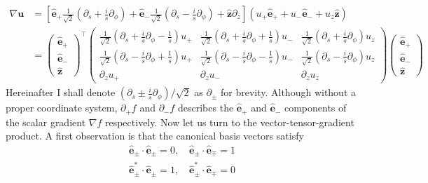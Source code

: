\begin{equation}\label{eqn:grad-u-canonical}
\begin{aligned}
    \nabla \mathbf{u} &= \left[\hat{\mathbf{e}}_+ \frac{1}{\sqrt{2}}\left(\partial_s + \frac{i}{s}\partial_\phi\right) + \hat{\mathbf{e}}_- \frac{1}{\sqrt{2}}\left(\partial_s - \frac{i}{s}\partial_\phi\right) + \hat{\mathbf{z}} \partial_z\right] \left(u_+ \hat{\mathbf{e}}_+ + u_- \hat{\mathbf{e}}_- + u_z \hat{\mathbf{z}}\right) \\ 
    &= \begin{pmatrix} \hat{\mathbf{e}}_+ \\ \hat{\mathbf{e}}_- \\ \hat{\mathbf{z}} \end{pmatrix}^\top 
    \begin{pmatrix}
        \frac{1}{\sqrt{2}} \left(\partial_s + \frac{i}{s}\partial_\phi - \frac{1}{s}\right) u_+ & \frac{1}{\sqrt{2}} \left(\partial_s + \frac{i}{s}\partial_\phi + \frac{1}{s}\right) u_- & \frac{1}{\sqrt{2}} \left(\partial_s + \frac{i}{s}\partial_\phi\right) u_z \\ 
        \frac{1}{\sqrt{2}} \left(\partial_s - \frac{i}{s}\partial_\phi + \frac{1}{s}\right) u_+ & \frac{1}{\sqrt{2}} \left(\partial_s - \frac{i}{s}\partial_\phi - \frac{1}{s}\right) u_- & \frac{1}{\sqrt{2}} \left(\partial_s - \frac{i}{s}\partial_\phi\right) u_z \\ 
        \partial_z u_+ & \partial_z u_- & \partial_z u_z
    \end{pmatrix}
    \begin{pmatrix} \hat{\mathbf{e}}_+ \\ \hat{\mathbf{e}}_- \\ \hat{\mathbf{z}} \end{pmatrix}
\end{aligned}
\end{equation}
%
Hereinafter I shall denote $(\partial_s \pm \frac{i}{s}\partial_\phi)/\sqrt{2}$ as $\partial_{\pm}$ for brevity. Although without a proper coordinate system, $\partial_+ f$ and $\partial_- f$ describes the $\hat{\mathbf{e}}_+$ and $\hat{\mathbf{e}}_-$ components of the scalar gradient $\nabla f$ respectively.
Now let us turn to the vector-tensor-gradient product. A first observation is that the canonical basis vectors satisfy
%
\[\begin{gathered}
    \hat{\mathbf{e}}_\pm \cdot \hat{\mathbf{e}}_\pm = 0,\quad 
    \hat{\mathbf{e}}_\pm \cdot \hat{\mathbf{e}}_\mp = 1 \\ 
    \hat{\mathbf{e}}_\pm^* \cdot \hat{\mathbf{e}}_\pm = 1,\quad 
    \hat{\mathbf{e}}_\pm^* \cdot \hat{\mathbf{e}}_\mp = 0
\end{gathered}
\]
